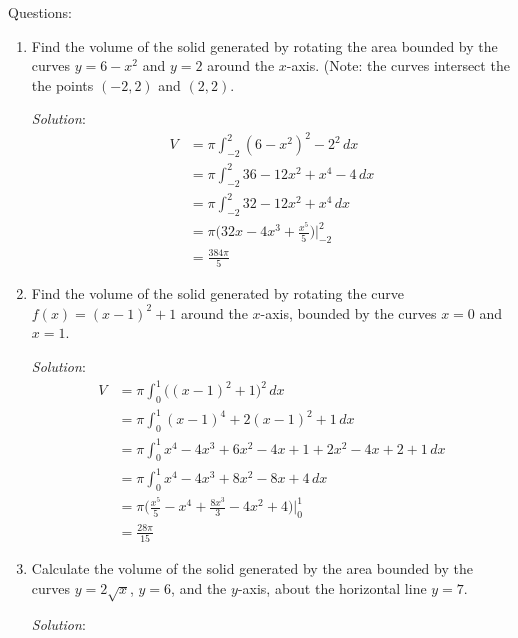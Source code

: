 \documentclass[16pt]{article}
\theoremstyle{remark}
\begin{document}
Questions:
\begin{enumerate}
\item Find the volume of the solid generated by rotating the area bounded by the curves $y=6-x^2$ and $y=2$ around the $x$-axis. (Note: the curves intersect the the points $(-2,2)$ and $(2,2)$.

\begin{mdframed}[style=TheoremFrame]
\textit{Solution}:\\

\begin{align*}
V&= \pi \int_{-2}^2 (6-x^2)^2 - 2^2 \, dx\\
&= \pi \int_{-2}^2 36 - 12x^2 + x^4 - 4 \, dx\\
&= \pi \int_{-2}^2 32 - 12x^2 + x^4  \, dx\\
&= \pi \bigg(32x - 4x^3 + \frac{x^5}{5} \bigg) \bigg|_{-2}^2\\
&= \frac{384\pi}{5}
\end{align*}
\end{mdframed}
\newpage
\item Find the volume of the solid generated by rotating the curve $f(x) = (x-1)^2+1$ around the $x$-axis, bounded by the curves $x=0$ and $x=1$.

\begin{mdframed}[style=TheoremFrame]
\textit{Solution}:\\

\begin{align*}
V &= \pi \int_0^1 \bigg( (x-1)^2 + 1 \bigg)^2 \, dx\\
&= \pi \int_0^1 (x-1)^4 + 2(x-1)^2 + 1 \, dx\\
&= \pi \int_0^1 x^4-4x^3+6x^2-4x+1 +2x^2-4x+2 +1 \, dx\\
&= \pi \int_0^1 x^4-4x^3+8x^2-8x+4 \, dx\\
&=\pi \bigg( \frac{x^5}{5} - x^4 + \frac{8x^3}{3}-4x^2+4 \bigg) \bigg|_0^1\\
&= \frac{28\pi}{15}
\end{align*}
\end{mdframed}
\newpage
\item Calculate the volume of the solid generated by the area bounded by the curves $y=2\sqrt{x}$, $y=6$, and the $y$-axis, about the horizontal line $y=7$.

\begin{mdframed}[style=TheoremFrame]
\textit{Solution}:\\


\end{mdframed}
\end{enumerate}
\end{document}
